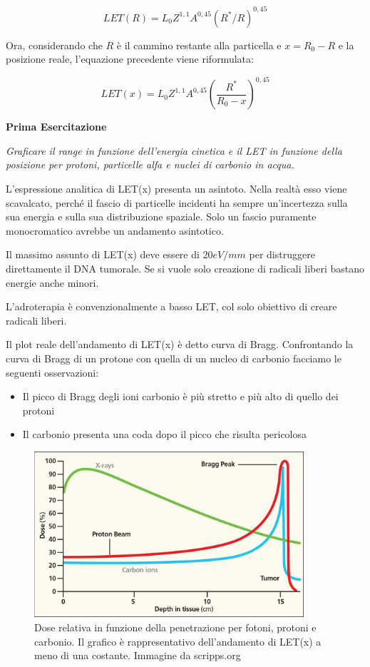 \begin{equation}
LET(R)=L_0Z^{1,1}A^{0,45}(R^*/R)^{0,45}
\end{equation}

Ora, considerando che $R$ è il cammino restante alla particella e $x=R_0-R$ e la posizione reale, l'equazione precedente viene riformulata:

\begin{equation}
LET(x)=L_0Z^{1,1}A^{0,45}(\frac{R^*}{R_0-x})^{0,45}
\end{equation}

\textbf{Prima Esercitazione}

\emph{Graficare il range in funzione dell'energia cinetica e il LET in funzione della posizione per protoni, particelle alfa e nuclei di carbonio in acqua.}

L'espressione analitica di LET(x) presenta un asintoto. Nella realtà esso viene scavalcato, perché il fascio di particelle incidenti ha sempre un'incertezza sulla sua energia e sulla sua distribuzione spaziale. Solo un fascio puramente monocromatico avrebbe un andamento asintotico. 

Il massimo assunto di LET(x) deve essere di $20 eV/mm$ per distruggere direttamente il DNA tumorale. Se si vuole solo creazione di radicali liberi bastano energie anche minori.

L'adroterapia è convenzionalmente a basso LET, col solo obiettivo di creare radicali liberi. 

Il plot reale dell'andamento di LET(x) è detto curva di Bragg. Confrontando la curva di Bragg di un protone con quella di un nucleo di carbonio facciamo le seguenti osservazioni:

\begin{itemize}
\item Il picco di Bragg degli ioni carbonio è più stretto e più alto di quello dei protoni
\item Il carbonio presenta una coda dopo il picco che risulta pericolosa
\end{itemize}

\begin{figure}
\centering
	\includegraphics[width=10cm, keepaspectratio]{figs/bragg.jpg}
	\caption{Dose relativa in funzione della penetrazione per fotoni, protoni e carbonio. Il grafico è rappresentativo dell'andamento di LET(x) a meno di una costante. Immagine da scripps.org}
	\label{fig:bragg}
\end{figure}


